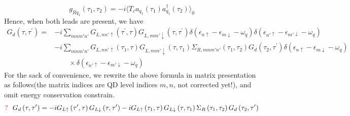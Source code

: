 \documentclass[aps,prb,onecolumn,amssymb,amsmath,superscriptaddress]{revtex4-1}
\begin{document}
\begin{equation}
g_{Rq_{1}}(\tau_{1}, \tau_{2}) = -i\langle T_{c}a_{q_{1}}(\tau_{1}) a_{q_{1}}^{\dag}(\tau_{2})\rangle_{0}
\end{equation}
Hence, when both leads are present, we have
\begin{equation}
\begin{split}
G_{d}\left(\tau, \tau^{\prime}\right)=&-i \sum_{mnm'n'}G_{L,nn' \uparrow}\left(\tau^{\prime}, \tau\right) G_{L,mm' \downarrow}\left(\tau, \tau^{\prime}\right)\delta\left(\epsilon_{n \uparrow}-\epsilon_{m \downarrow}-\omega_{q}\right) \delta\left(\epsilon_{n' \uparrow}-\epsilon_{m' \downarrow}-\omega_{q}\right)\\
&-i \sum_{mnm'n'}G_{L,nn' \uparrow}\left(\tau_{1}, \tau\right) G_{L,mm' \downarrow}\left(\tau, \tau_{1}\right) \Sigma_{R,mnm'n'}\left(\tau_{1}, \tau_{2}\right) G_{d}\left(\tau_{2}, \tau^{\prime}\right) \delta\left(\epsilon_{n \uparrow}-\epsilon_{m \downarrow}-\omega_{q}\right)\\
&\qquad\times \delta\left(\epsilon_{n' \uparrow}-\epsilon_{m' \downarrow}-\omega_{q}\right)
\label{eq:1}
\end{split}
\end{equation}
For the sack of convenience, we rewrite the above formula in matrix presentation as follows(the matrix indices are QD level indices $m,n$, not corrected yet!), and omit energy conservation constrain.
\begin{equation}
{\color{red}{?}}~~G_{d}\left(\tau, \tau^{\prime}\right)=-i G_{L \uparrow}\left(\tau^{\prime}, \tau\right) G_{L \downarrow}\left(\tau, \tau^{\prime}\right)-i G_{L \uparrow}\left(\tau_{1}, \tau\right) G_{L \downarrow}\left(\tau, \tau_{1}\right) \Sigma_{R }\left(\tau_{1}, \tau_{2}\right) G_{d}\left(\tau_{2}, \tau^{\prime}\right)
\end{equation}
\end{document}
